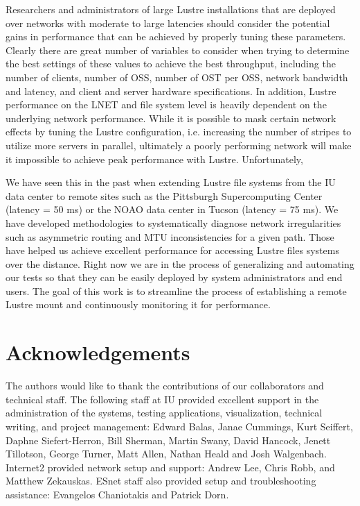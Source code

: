 \documentclass[]{sigplan-proc}
\begin{document}
Researchers and administrators of large Lustre installations that are deployed over networks with moderate to
large latencies should consider the potential gains in performance that can be achieved by properly tuning
these parameters. Clearly there are great number of variables to consider when trying to determine the best
settings of these values to achieve the best throughput, including the number of clients, number of OSS,
number of OST per OSS, network bandwidth and latency, and client and server hardware specifications. In
addition, Lustre performance on the LNET and file system level is heavily dependent on the underlying
network performance. While it is possible to mask certain network effects by tuning the Lustre configuration,
i.e. increasing the number of stripes to utilize more servers in parallel, ultimately a poorly performing network
will make it impossible to achieve peak performance with Lustre. Unfortunately, 

We have seen this in the past when extending Lustre file systems from the IU data center to remote sites such
as the Pittsburgh Supercomputing Center (latency = 50 ms) or the NOAO data center in Tucson (latency = 75 ms). We
have developed methodologies to systematically diagnose network irregularities such as asymmetric routing and
MTU inconsistencies for a given path. Those have helped us achieve excellent performance for accessing Lustre
files systems over the distance. Right now we are in the process of generalizing and automating our tests so
that they can be easily deployed by system administrators and end users. The goal of this work is to
streamline the process of establishing a remote Lustre mount and continuously monitoring it for performance.
  
\section{Acknowledgements}

The authors would like to thank the contributions of our collaborators and technical staff. The following
staff at IU provided excellent support in the administration of the systems, testing applications,
visualization, technical writing, and project management: Edward Balas, Janae Cummings, Kurt Seiffert, Daphne
Siefert-Herron, Bill Sherman, Martin Swany, David Hancock, Jenett Tillotson, George Turner, Matt Allen, Nathan Heald and Josh Walgenbach. Internet2 provided network setup and support: Andrew Lee, Chris Robb, and Matthew Zekauskas. ESnet staff also provided setup and troubleshooting assistance: Evangelos Chaniotakis and Patrick Dorn.
\end{document}

